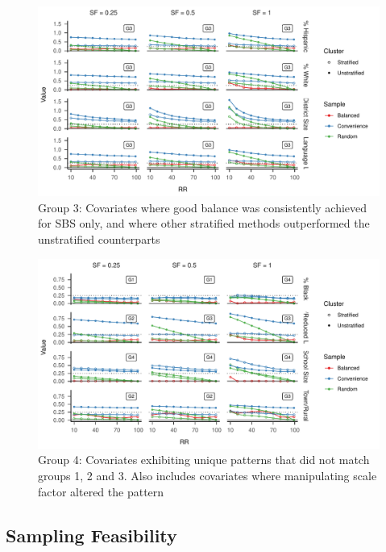 \documentclass[
  english,
  man,floatsintext]{apa6}
\begin{document}
\begin{figure}
\centering
\includegraphics{6---Paper_files/figure-latex/fig-smd-group3-1.pdf}
\caption{\label{fig:fig-smd-group3}Group 3: Covariates where good balance was consistently achieved for SBS only, and where other stratified methods outperformed the unstratified counterparts}
\end{figure}



\begin{figure}
\centering
\includegraphics{6---Paper_files/figure-latex/fig-smd-group4-1.pdf}
\caption{\label{fig:fig-smd-group4}Group 4: Covariates exhibiting unique patterns that did not match groups 1, 2 and 3. Also includes covariates where manipulating scale factor altered the pattern}
\end{figure}

\newpage

\hypertarget{feasibility-results}{%
\subsection{Sampling Feasibility}\label{feasibility-results}}
\end{document}
